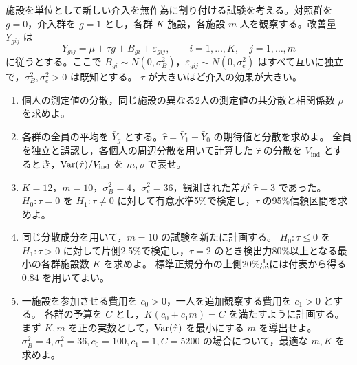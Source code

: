 \documentclass[a4paper,11pt]{ltjsarticle}
\begin{document}
施設を単位として新しい介入を無作為に割り付ける試験を考える。対照群を $g=0$，介入群を $g=1$ とし，各群 $K$ 施設，各施設 $m$ 人を観察する。改善量 $Y_{gij}$ は
\[
Y_{gij}=\mu+\tau g+B_{gi}+\varepsilon_{gij},\qquad
i=1,\ldots,K,\quad j=1,\ldots,m
\]
に従うとする。ここで $B_{gi}\sim N(0,\sigma_B^2)$，$\varepsilon_{gij}\sim N(0,\sigma_e^2)$ はすべて互いに独立で，$\sigma_B^2,\sigma_e^2>0$ は既知とする。
$\tau$ が大きいほど介入の効果が大きい。
\begin{enumerate}
\item 個人の測定値の分散，同じ施設の異なる2人の測定値の共分散と相関係数 $\rho$ を求めよ。
\item 各群の全員の平均を $\bar Y_g$ とする。$\hat\tau=\bar Y_1-\bar Y_0$ の期待値と分散を求めよ。
全員を独立と誤認し，各個人の周辺分散を用いて計算した $\hat\tau$ の分散を $V_{\mathrm{ind}}$ とするとき，$\operatorname{Var}(\hat\tau)/V_{\mathrm{ind}}$ を $m,\rho$ で表せ。
\item $K=12$，$m=10$，$\sigma_B^2=4$，$\sigma_e^2=36$，観測された差が $\hat\tau=3$ であった。
$H_0:\tau=0$ を $H_1:\tau\ne0$ に対して有意水準5\%で検定し，$\tau$ の95\%信頼区間を求めよ。
\item 同じ分散成分を用いて，$m=10$ の試験を新たに計画する。
$H_0:\tau\leq0$ を $H_1:\tau>0$ に対して片側2.5\%で検定し，$\tau=2$ のとき検出力80\%以上となる最小の各群施設数 $K$ を求めよ。
標準正規分布の上側20\%点には付表から得る $0.84$ を用いてよい。
\item 一施設を参加させる費用を $c_0>0$，一人を追加観察する費用を $c_1>0$ とする。
各群の予算を $C$ とし，$K(c_0+c_1m)=C$ を満たすように計画する。
まず $K,m$ を正の実数として，$\operatorname{Var}(\hat\tau)$ を最小にする $m$ を導出せよ。
$\sigma_B^2=4,\sigma_e^2=36,c_0=100,c_1=1,C=5200$ の場合について，最適な $m,K$ を求めよ。
\end{enumerate}
\newpage
\end{document}
